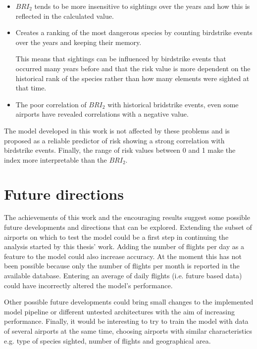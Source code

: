 \begin{itemize}
    \item $BRI_2$ tends to be more insensitive to sightings over the years and how this is reflected in the calculated value.
    \item Creates a ranking of the most dangerous species by counting birdstrike events over the years and keeping their memory.
    
    This means that sightings can be influenced by birdstrike events that occurred many years before and that the risk value is more dependent on the historical rank of the species rather than how many elements were sighted at that time.
    \item The poor correlation of $BRI_2$ with historical bridstrike events, even some airports have revealed correlations with a negative value. 
\end{itemize}


The model developed in this work is not affected by these problems and is proposed as a reliable predictor of risk showing a strong correlation with birdstrike events. 
Finally, the range of risk values between 0 and 1 make the index more interpretable than the $BRI_2$.


\section{Future directions}
The achievements of this work and the encouraging results suggest some possible future developments and directions that can be explored.
Extending the subset of airports on which to test the model could be a first step in continuing the analysis started by this thesis' work.
Adding the number of flights per day as a feature to the model could also increase accuracy. At the moment this has not been possible because only the number of flights per month is reported in the available database. Entering an average of daily flights (i.e. future based data) could have incorrectly altered the model's performance. 

Other possible future developments could bring small changes to the implemented model pipeline or different untested architectures with the aim of increasing performance.
Finally, it would be interesting to try to train the model with data of several airports at the same time, choosing airports with similar characteristics e.g. type of species sighted, number of flights and geographical area.
